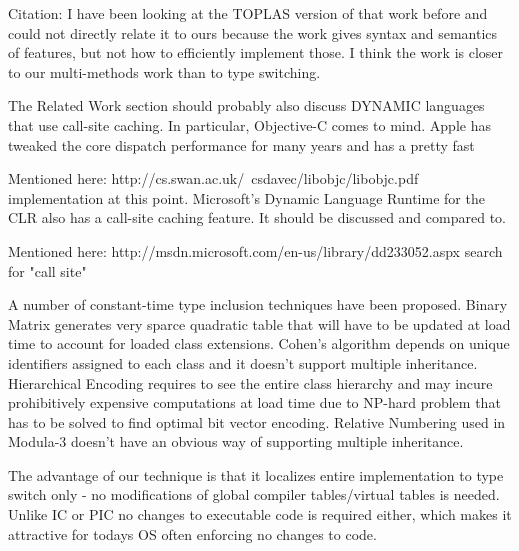 Citation\cite{Millstein:2002:MTH:581478.581489}:
I have been looking at the TOPLAS version of that work before and could not 
directly relate it to ours because the work gives syntax and semantics of 
features, but not how to efficiently implement those. I think the work is closer 
to our multi-methods work than to type switching.

The Related Work section should probably also discuss DYNAMIC languages that
use call-site caching. In particular, Objective-C comes to mind. Apple has
tweaked the core dispatch performance for many years and has a pretty fast

Mentioned here: http://cs.swan.ac.uk/~csdavec/libobjc/libobjc.pdf 
implementation at this point. Microsoft's Dynamic Language Runtime for the CLR
also has a call-site caching feature. It should be discussed and compared to.

Mentioned here:  http://msdn.microsoft.com/en-us/library/dd233052.aspx search for "call site"

A number of constant-time type inclusion techniques have been proposed. 
Binary Matrix generates very sparce quadratic table that will have to be updated 
at load time to account for loaded class extensions. Cohen's algorithm depends 
on unique identifiers assigned to each class and it doesn't support multiple 
inheritance. 
Hierarchical Encoding requires to see the entire class hierarchy and may incure 
prohibitively expensive computations at load time due to NP-hard problem that 
has to be solved to find optimal bit vector encoding. 
Relative Numbering used in Modula-3 doesn't have an obvious way of supporting 
multiple inheritance.

The advantage of our technique is that it localizes entire implementation to 
type switch only - no modifications of global compiler tables/virtual tables is 
needed. Unlike IC or PIC no changes to executable code is required either, which 
makes it attractive for todays OS often enforcing no changes to code.